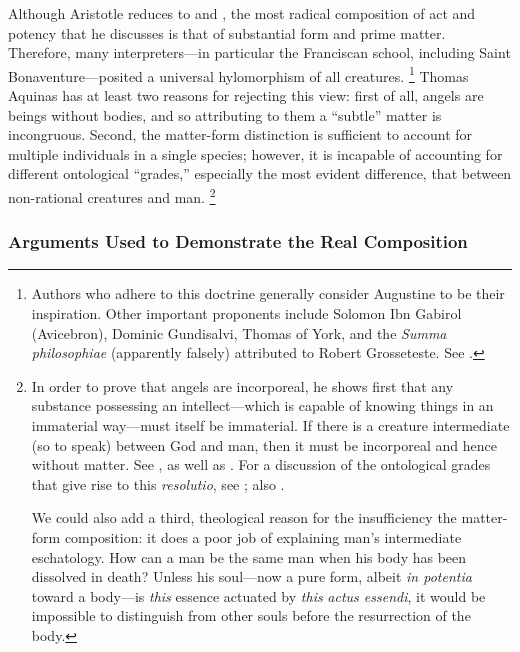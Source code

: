 Although Aristotle reduces  to  and , the most radical composition of act and potency that he discusses is that of substantial form and prime matter. Therefore, many interpreters---in particular the Franciscan school, including Saint Bonaventure---posited a universal hylomorphism of all creatures.%
%
\footnote{Authors who adhere to this doctrine generally consider Augustine to be their inspiration. Other important proponents include Solomon Ibn Gabirol (Avicebron), Dominic Gundisalvi, Thomas of York, and the \emph{Summa philosophiae} (apparently falsely) attributed to Robert Grosseteste. See \cite{stanford:binarium}.}
%
Thomas Aquinas has at least two reasons for rejecting this view: first of all, angels are beings without bodies, and so attributing to them a ``subtle'' matter is incongruous. Second, the matter-form distinction is sufficient to account for multiple individuals in a single species; however, it is incapable of accounting for different ontological ``grades,'' especially the most evident difference, that between non-rational creatures and man.%
%
\footnote{In order to prove that angels are incorporeal, he shows first that any substance possessing an intellect---which is capable of knowing things in an immaterial way---must itself be immaterial. If there is a creature intermediate (so to speak) between God and man, then it must be incorporeal and hence without matter. See \cite[I, q.~50, a.~1, co., and a.~2]{st:summa}, as well as \cite[208]{fabro:nozione}.
For a discussion of the ontological grades that give rise to this \emph{resolutio}, see \cite[209--212]{izquierdo:vita}; also \cite[38--43]{lucas:hombre}.

We could also add a third, theological reason for the insufficiency the matter-form composition: it does a poor job of explaining man's intermediate eschatology. How can a man be the same man when his body has been dissolved in death? Unless his soul---now a pure form, albeit \emph{in potentia} toward a body---is \emph{this} essence actuated by \emph{this} \emph{actus essendi}, it would be impossible to distinguish from other souls before the resurrection of the body.}
%

\subsubsection{Arguments Used to Demonstrate the Real Composition}
\label{arguments-real-composition}

